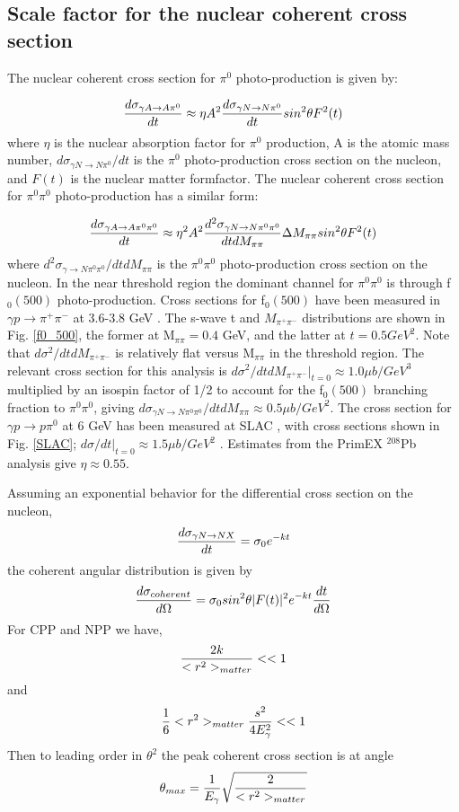  \subsection{Scale factor for the nuclear coherent cross section}

The nuclear coherent cross section for  $\pi^0$ photo-production is given by: 

$$ {d\sigma_{\gamma A \rightarrow A  \pi^0 } \over dt } \approx \eta A^2 { d\sigma_{\gamma N \rightarrow N \pi^0 } \over dt }sin^2 \theta F^2(t) $$
where $\eta$ is the nuclear absorption factor for $\pi^0$ production, A is the atomic mass number, $d\sigma_{\gamma N \rightarrow N\pi^0 } / dt$ is the $\pi^0$ photo-production cross section on the nucleon, and $F(t)$ is the nuclear matter formfactor.  The nuclear coherent cross section for  $\pi^0 \pi^0$ photo-production has a similar form: 

$$ {d\sigma_{\gamma A \rightarrow A  \pi^0 \pi^0} \over dt } \approx  \eta^2 A^2 { d^2 \sigma_{\gamma N \rightarrow N \pi^0 \pi^0} \over dt dM_{\pi \pi}}\Delta M_{\pi \pi} sin^2 \theta F^2(t) $$
where $d^2\sigma_{\gamma \rightarrow N\pi^0 \pi^0} / dt dM_{\pi \pi}$ is the $\pi^0 \pi^0$ photo-production cross section on the nucleon.
  In the near threshold region the dominant channel for $\pi^0 \pi^0$ is through f$_0(500)$ photo-production.    Cross sections for f$_0(500)$   have been measured in 
  $\gamma p \rightarrow \pi^+ \pi^-$ at 3.6-3.8 GeV \cite{Battaglieri:2009aa}.   The s-wave t and $M_{\pi^+ \pi^-}$ distributions are shown in Fig. \ref{f0_500}, the former at M$_{\pi \pi}=0.4$ GeV, and the latter at $t=0.5 GeV^2$.  Note that  
  $d\sigma^2 / dt dM_{\pi^+ \pi^-}$ is relatively flat versus M$_{\pi \pi}$ in the threshold region. The relevant cross section for this analysis is $d\sigma^2 / dt dM_{\pi^+ \pi^-}|_{ t = 0} \approx 1.0 \mu b/GeV^3$  multiplied by an isospin factor of 1/2 to account for the f$_0(500)$ branching fraction to $\pi^0 \pi^0$, giving $d \sigma_{\gamma N \rightarrow N \pi^0 \pi^0} / dt dM_{\pi \pi} \approx 0.5 \mu b / GeV^2 $. The cross section for  $\gamma p \rightarrow  p \pi^0$ at 6 GeV has been measured at SLAC \cite{Anderson:1971}, with cross sections shown in Fig. \ref{SLAC};   $d\sigma / dt|_{t=0} \approx 1.5 \mu b/GeV^2$ .   Estimates from the PrimEX $^{208}$Pb analysis give $\eta \approx 0.55$.  
  
  Assuming an exponential behavior for the differential cross section on the nucleon, 
  $$ {d\sigma_{\gamma N \rightarrow N X} \over dt} = \sigma_0 e^{-kt}$$
  the coherent angular distribution is given by
  $$ { d\sigma_{coherent} \over d\Omega} = \sigma_0 sin^2 \theta |F(t)|^2 e^{-kt} {dt \over d\Omega}$$ 
  For CPP and NPP we have, 
  $$ {2k \over <r^2>_{matter}}<<1 $$
  and 
  $${1 \over 6}<r^2>_{matter} {s^2 \over 4E^2_\gamma}<<1$$
   Then to leading order in $\theta^2$ the peak coherent cross section is at angle 
$$ \theta_{max}={1 \over E_\gamma}\sqrt{ 2 
 \over <r^2>_{matter} } $$
 
